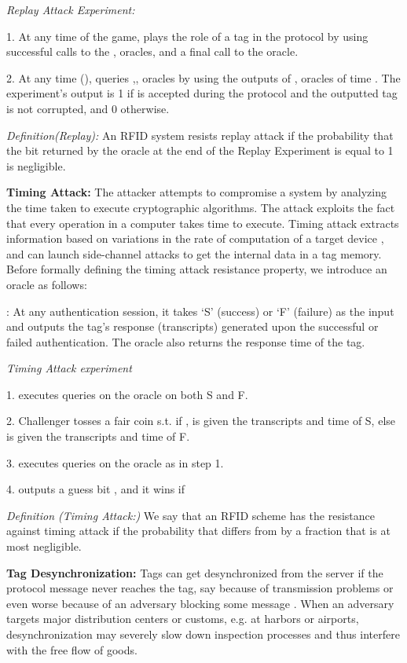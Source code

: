 \documentclass{easychair}
\begin{document}
\textit{Replay Attack Experiment:}

1. At any time  of the game,  plays the role of a tag in the protocol by
using successful calls to the ,  oracles, and a final call to the 
oracle.

2. At any time  (),  queries ,,  oracles by using the outputs of ,  oracles of time . The experiment's output is 1 if  is accepted during the protocol and the outputted tag is not corrupted, and 0 otherwise.

\textit{Definition(Replay):} An RFID system resists replay attack if the probability that
the bit  returned by the  oracle at the end of the Replay Experiment
is equal to 1 is negligible.

\textbf{Timing Attack:} The attacker attempts to compromise a system by analyzing the 
time taken to execute cryptographic algorithms. The attack exploits the fact 
that every operation in a computer takes time to execute. Timing attack extracts
information based on variations in the rate of computation
of a target device \cite{juels}, and can launch side-channel attacks \cite{sidechannel} to get the internal data in a tag memory. Before formally defining the timing attack resistance property, we introduce an oracle as follows:

: At any authentication session, it takes `S' (success) or `F' (failure) as the input and outputs the tag's response (transcripts) generated upon the successful or failed authentication. The oracle also returns the response time of the tag.

\textit{Timing Attack experiment} 

1.  executes queries on the  oracle on both S and F.

2. Challenger  tosses a fair coin  s.t. if ,  is given the transcripts and time of S, else is given the transcripts and time of F.

3.  executes queries on the  oracle as in step 1.

4.  outputs a guess bit , and it wins if  

\textit{Definition (Timing Attack:)} We say that an RFID scheme has the resistance against timing attack if the probability that  differs from  by a fraction that is at most negligible.
  


 
\textbf{Tag Desynchronization:} Tags can get desynchronized from the server if the protocol message never reaches the tag,
say because of transmission problems or even worse because of an adversary blocking some message \cite{AutoID}. When an adversary targets major distribution centers or customs, e.g. at harbors or airports, desynchronization may severely slow down inspection processes and thus interfere with the free flow of goods.
\end{document}
